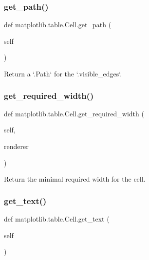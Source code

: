 \subsubsection{\texorpdfstring{get\+\_\+path()}{get\_path()}}
{\footnotesize\ttfamily def matplotlib.\+table.\+Cell.\+get\+\_\+path (\begin{DoxyParamCaption}\item[{}]{self }\end{DoxyParamCaption})}

\begin{DoxyVerb}Return a `.Path` for the `.visible_edges`.\end{DoxyVerb}
 \mbox{\label{classmatplotlib_1_1table_1_1Cell_a6fa5b2fd7bb8216c31f3087fcb7ff856}} 
\subsubsection{\texorpdfstring{get\+\_\+required\+\_\+width()}{get\_required\_width()}}
{\footnotesize\ttfamily def matplotlib.\+table.\+Cell.\+get\+\_\+required\+\_\+width (\begin{DoxyParamCaption}\item[{}]{self,  }\item[{}]{renderer }\end{DoxyParamCaption})}

\begin{DoxyVerb}Return the minimal required width for the cell.\end{DoxyVerb}
 \mbox{\label{classmatplotlib_1_1table_1_1Cell_a0a769932dbf9e6bebc21d40a63bb30db}} 
\subsubsection{\texorpdfstring{get\+\_\+text()}{get\_text()}}
{\footnotesize\ttfamily def matplotlib.\+table.\+Cell.\+get\+\_\+text (\begin{DoxyParamCaption}\item[{}]{self }\end{DoxyParamCaption})}

